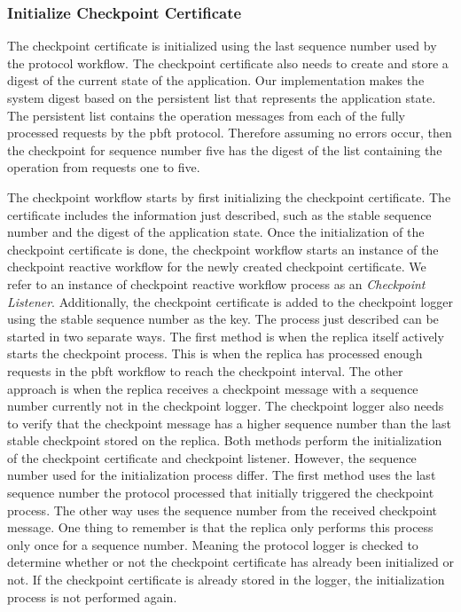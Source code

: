 \subsubsection{Initialize Checkpoint Certificate}
The checkpoint certificate is initialized using the last sequence number used by the protocol workflow. The checkpoint certificate also needs to create and store a digest of the current state of the application. Our implementation makes the system digest based on the persistent list that represents the application state. The persistent list contains the operation messages from each of the fully processed requests by the \ac{pbft} protocol. Therefore assuming no errors occur, then the checkpoint for sequence number five has the digest of the list containing the operation from requests one to five. 

The checkpoint workflow starts by first initializing the checkpoint certificate. The certificate includes the information just described, such as the stable sequence number and the digest of the application state. Once the initialization of the checkpoint certificate is done, the checkpoint workflow starts an instance of the checkpoint reactive workflow for the newly created checkpoint certificate. 
We refer to an instance of checkpoint reactive workflow process as an \emph{Checkpoint Listener}. Additionally, the checkpoint certificate is added to the checkpoint logger using the stable sequence number as the key. The process just described can be started in two separate ways. The first method is when the replica itself actively starts the checkpoint process. This is when the replica has processed enough requests in the \ac{pbft} workflow to reach the checkpoint interval. The other approach is when the replica receives a checkpoint message with a sequence number currently not in the checkpoint logger. The checkpoint logger also needs to verify that the checkpoint message has a higher sequence number than the last stable checkpoint stored on the replica. Both methods perform the initialization of the checkpoint certificate and checkpoint listener. However,  the sequence number used for the initialization process differ. The first method uses the last sequence number the protocol processed that initially triggered the checkpoint process. The other way uses the sequence number from the received checkpoint message.  One thing to remember is that the replica only performs this process only once for a sequence number. Meaning the protocol logger is checked to determine whether or not the checkpoint certificate has already been initialized or not. If the checkpoint certificate is already stored in the logger, the initialization process is not performed again.

